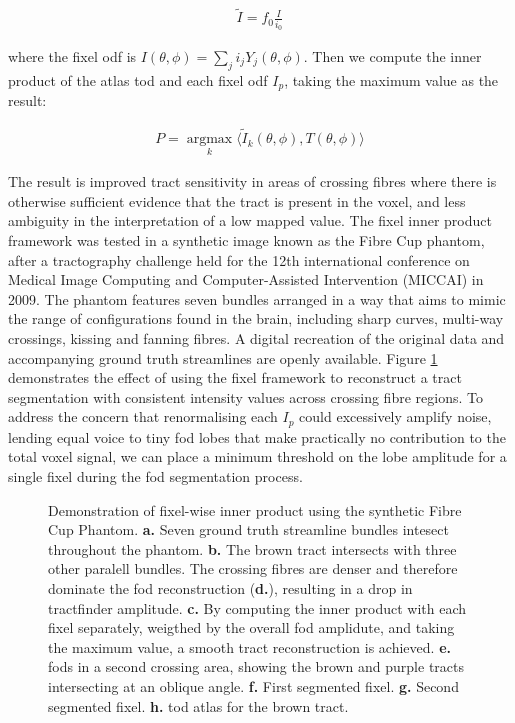 \begin{align}
  \widetilde{I} = f_0\frac{I}{i_0}
\end{align}

where the fixel \gls{odf} is $I(\theta, \phi) = \sum_j i_j Y_j(\theta,\phi)$.
Then we compute the inner product of the atlas \gls{tod} and each fixel \gls{odf} $I_p$, taking the maximum value as the result:

\begin{align}
  P = \operatorname*{argmax}_k \langle \widetilde{I}_k(\theta,\phi), T(\theta,\phi) \rangle
\end{align}

The result is improved tract sensitivity in areas of crossing fibres where there is otherwise sufficient evidence that the tract is present in the voxel, and less ambiguity in the interpretation of a low mapped value.
The fixel inner product framework was tested in a synthetic image known as the Fibre Cup phantom, after a tractography challenge held for the 12th international conference on Medical Image Computing and Computer-Assisted Intervention (MICCAI) in 2009\autocite{Fillard2011}.
The phantom features seven bundles arranged in a way that aims to mimic the range of configurations found in the brain, including sharp curves, multi-way crossings, kissing and fanning fibres.
A digital recreation of the original data and accompanying ground truth streamlines are openly available\autocite{NITRC}.
Figure \ref{fig:fixip} demonstrates the effect of using the fixel framework to reconstruct a tract segmentation with consistent intensity values across crossing fibre regions.
To address the concern that renormalising each $I_p$ could excessively amplify noise, lending equal voice to tiny \gls{fod} lobes that make practically no contribution to the total voxel signal, we can place a minimum threshold on the lobe amplitude for a single fixel during the \gls{fod} segmentation process.

\begin{figure}
  \centering
  
  \caption{Demonstration of fixel-wise inner product using the synthetic Fibre Cup Phantom. \textbf{a.} Seven ground truth streamline bundles intesect throughout the phantom. \textbf{b.} The brown tract intersects with three other paralell bundles. The crossing fibres are denser and therefore dominate the \gls{fod} reconstruction (\textbf{d.}), resulting in a drop in tractfinder amplitude. \textbf{c.} By computing the inner product with each fixel separately, weigthed by the overall \gls{fod} amplidute, and taking the maximum value, a smooth tract reconstruction is achieved. \textbf{e.} \glspl{fod} in a second crossing area, showing the brown and purple tracts intersecting at an oblique angle. \textbf{f.} First segmented fixel. \textbf{g.} Second segmented fixel. \textbf{h.} \gls{tod} atlas for the brown tract.}\label{fig:fixip}
\end{figure}
